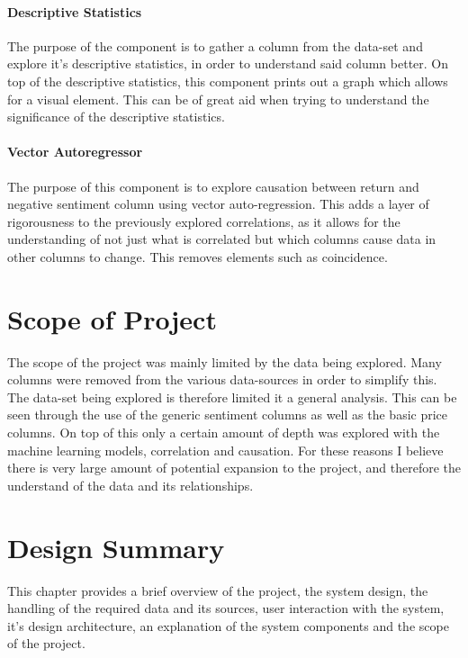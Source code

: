 \paragraph{Descriptive Statistics}

The purpose of the component is to gather a column from the data-set and explore it's descriptive statistics, in order to understand said column better. On top of the descriptive statistics, this component prints out a graph which allows for a visual element. This can be of great aid when trying to understand the significance of the descriptive statistics.

\paragraph{Vector Autoregressor}

The purpose of this component is to explore causation between return and negative sentiment column using vector auto-regression. This adds a layer of rigorousness to the previously explored correlations, as it allows for the understanding of not just what is correlated but which columns cause data in other columns to change. This removes elements such as coincidence.

\section{Scope of Project}

The scope of the project was mainly limited by the data being explored. Many columns were removed from the various data-sources in order to simplify this. The data-set being explored is therefore limited it a general analysis. This can be seen through the use of the generic sentiment columns as well as the basic price columns. On top of this only a certain amount of depth was explored with the machine learning models, correlation and causation. For these reasons I believe there is very large amount of potential expansion to the project, and therefore the understand of the data and its relationships.

\section{Design Summary}

This chapter provides a brief overview of the project, the system design, the handling of the required data and its sources, user interaction with the system, it's design architecture, an explanation of the system components and the scope of the project.